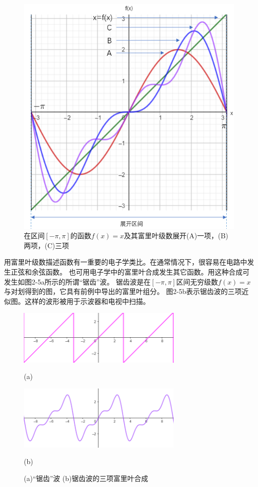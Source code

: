 \begin{figure}[htbp]
    \centering
    \includegraphics[scale=0.4]{./fig/2-4.png}
    \caption{在区间$[-\pi,\pi]$的函数$f(x)=x$及其富里叶级数展开(A)一项，(B)两项，(C)三项}
\end{figure}

用富里叶级数描述函数有一重要的电子学类比。在通常情况下，很容易在电路中发生正弦和余弦函数。
也可用电子学中的富里叶合成发生其它函数。用这种合成可发生如图2-5a所示的所谓“锯齿”波。
锯齿波是在$[-\pi,\pi]$区间无穷级数$f(x)=x$与对划得到的图，它具有前例中导出的富里叶组分。
图2-5b表示锯齿波的三项近似图。这样的波形被用于示波器和电视中扫描。

\begin{figure}[htbp]
    \centering
    \begin{minipage}[t]{0.7\textwidth}
    \centering
    \includegraphics[width=8cm]{./fig/2-5a.png}
    
    (a)
    \end{minipage}
    \begin{minipage}[t]{0.7\textwidth}
    \centering
    \includegraphics[width=8cm]{./fig/2-5b.png}
    
    (b)
    \end{minipage}
    \caption{(a)“锯齿”波 \quad (b)锯齿波的三项富里叶合成}
\end{figure}

